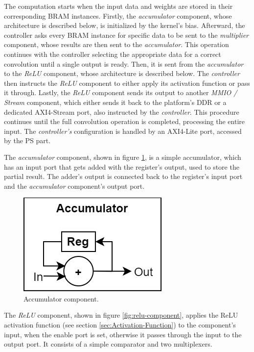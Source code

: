 The computation starts when the input data and weights are stored in their corresponding BRAM instances. Firstly, the \emph{accumulator} component, whose architecture is described below, is initialized by the kernel's bias. Afterward, the controller asks every BRAM instance for specific data to be sent to the \emph{multiplier} component, whose results are then sent to the \emph{accumulator}. This operation continues with the controller selecting the appropriate data for a correct convolution until a single output is ready. Then, it is sent from the \emph{accumulator} to the \emph{ReLU} component, whose architecture is described below. The \emph{controller} then instructs the \emph{ReLU} component to either apply its activation function or pass it through. Lastly, the \emph{ReLU} component sends its output to another \emph{MMIO / Stream} component, which either sends it back to the platform's DDR or a dedicated AXI4-Stream port, also instructed by the \emph{controller}. This procedure continues until the full convolution operation is completed, processing the entire input. The \emph{controller's} configuration is handled by an AXI4-Lite port, accessed by the PS part.

The \emph{accumulator} component, shown in figure \ref{fig:accumulator-component}, is a simple accumulator, which has an input port that gets added with the register's output, used to store the partial result. The adder's output is connected back to the register's input port and the \emph{accumulator} component's output port.

\begin{figure} [H]
	\centering
	\includegraphics[scale=0.4]{Images/Platform/Accumulator_component.png}
	\decoRule
	\caption[Accumulator component]{Accumulator component.}
	\label{fig:accumulator-component}
\end{figure}

The \emph{ReLU} component, shown in figure \ref{fig:relu-component}, applies the ReLU activation function (see section \ref{sec:Activation-Function}) to the component's input, when the enable port is set, otherwise it passes through the input to the output port. It consists of a simple comparator and two multiplexers.

